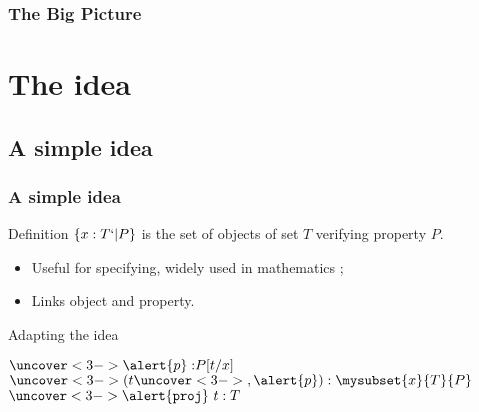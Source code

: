 \begin{frame}[plain]
  \titlepage
  \vfill\hfill
\end{frame}

\begin{frame}[plain]
  \frametitle{The Big Picture}
\end{frame}

\frame{\tableofcontents}

\section{The idea}

\subsection{A simple idea}
\begin{frame}
  \frametitle{A simple idea}
  
  \begin{block}{Definition}
    $\{ x : T `| P \}$ is the set of objects of set $T$ verifying property $P$. 
  \end{block}
  
  \begin{itemize}
  \item Useful for specifying, widely used in mathematics ;    
  \item Links object and property.
  \end{itemize}
  \pause
  \begin{block}{Adapting the idea} 
    \begin{center}
      {$\uncover<3->{\alert{p} : }P[t/x]$}
      {$\uncover<3->{(}t\uncover<3->{, \alert{p})} : \mysubset{x}{T}{P}$}
      {}\DP\quad      
      {$\uncover<3->{\alert{\texttt{proj}}~}t : T$}
      {}
      \DP
    \end{center}
  \end{block}  
\end{frame}

